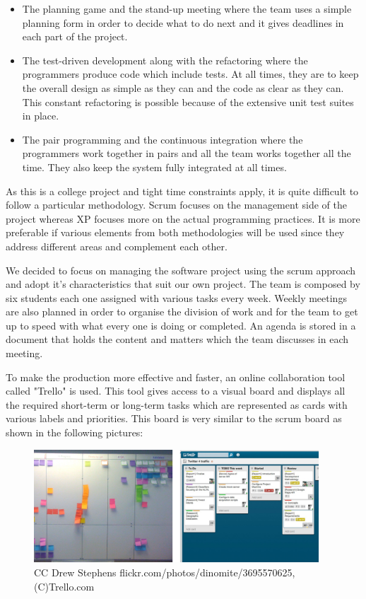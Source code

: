 \begin{itemize}
\item The planning game and the stand-up meeting where the team uses a simple planning form in order to decide what to do next and it gives deadlines in each part of the project. 
\item The test-driven development along with the refactoring where the programmers produce code which include tests. At all times, they are to keep the overall design as simple as they can and the code as clear as they can. This constant refactoring is possible because of the extensive unit test suites in place.
\item The pair programming and the continuous integration where the programmers work together in pairs and all the team works together all the time. They also keep the system fully integrated at all times. 
\end{itemize}

As this is a college project and tight time constraints apply, it is quite difficult to follow a particular methodology. Scrum focuses on the management side of the project whereas XP focuses more on the actual programming practices. It is more preferable if various elements from both methodologies will be used since they address different areas and complement each other.

We decided to focus on managing the software project using the scrum approach and adopt it's characteristics that suit our own project. The team is composed by six students each one assigned with various tasks every week. Weekly meetings are also planned in order to organise the division of work and for the team to get up to speed with what every one is doing or completed. An agenda is stored in a document that holds the content and matters which the team discusses in each meeting.

To make the production more effective and faster, an online collaboration tool called "Trello" is used. This tool gives access to a visual board and displays all the required short-term or long-term tasks which are represented as cards with various labels and priorities. This board is very similar to the scrum board as shown in the following pictures:

\begin{figure}[here]
\begin{center}
\includegraphics[width=0.95\textwidth]{images/scrumboard.jpg}
\end{center}
\caption{CC Drew Stephens flickr.com/photos/dinomite/3695570625, (C)Trello.com}
\end{figure}

